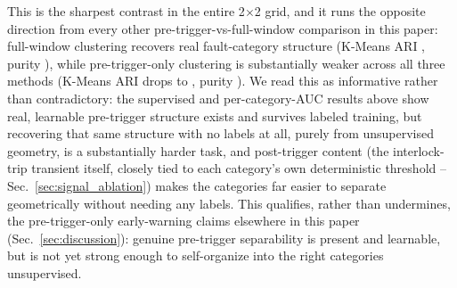 This is the sharpest contrast in the entire 2$\times$2 grid, %
and it runs the opposite direction from every other pre-trigger-vs-full-window comparison in this paper: full-window clustering recovers real fault-category structure (K-Means ARI \MetricZeroSevenbPhaseTwoMultilabelUnsupervisedKmeansAri{}, purity \MetricZeroSevenbPhaseTwoMultilabelUnsupervisedKmeansPurity{}), while pre-trigger-only clustering is substantially weaker across all three methods (K-Means ARI drops to \MetricZeroSevenbPhaseTwoMultilabelUnsupervisedPretriggerKmeansAri{}, purity \MetricZeroSevenbPhaseTwoMultilabelUnsupervisedPretriggerKmeansPurity{}). We read this as informative rather than contradictory: the supervised and per-category-AUC results above show real, learnable pre-trigger structure exists and survives labeled training, but recovering that same structure with no labels at all, purely from unsupervised geometry, is a substantially harder task, and post-trigger content (the interlock-trip transient itself, closely tied to each category's own deterministic threshold -- Sec.~\ref{sec:signal_ablation}) makes the categories far easier to separate geometrically without needing any labels. This qualifies, rather than undermines, the pre-trigger-only early-warning claims elsewhere in this paper (Sec.~\ref{sec:discussion}): genuine pre-trigger separability is present and learnable, but is not yet strong enough to self-organize into the right categories unsupervised.
